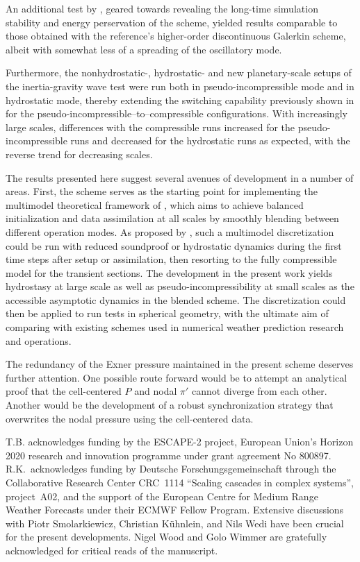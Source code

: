 \documentclass{ametsoc}
\newcommand{\sblue}[1]{\textcolor{sblue}{#1}}
\newcommand{\revision}[1]{\sblue{#1}}
\theoremstyle{definition}
\begin{document}
An additional test by \citet{BaldaufBrdar2013}, geared towards revealing the long-time simulation stability and energy perservation of the scheme, yielded results comparable to those obtained with the reference's higher-order discontinuous Galerkin scheme, albeit with somewhat less of a spreading of the oscillatory mode. 

Furthermore, the \revision{nonhydrostatic-}, hydrostatic- and new planetary-scale setups of the inertia-gravity wave test were run both in pseudo-incompressible mode and in hydrostatic mode, thereby extending the switching capability previously shown in \cite{BenacchioEtAl2014} for the pseudo-incompressible--to--compressible configurations. \revision{With increasingly large scales, differences with the compressible runs increased for the pseudo-incompressible runs and decreased for the hydrostatic runs as expected,  with the reverse trend for decreasing scales.}

The results presented here suggest several avenues of development in a number of areas. First, the scheme serves as the starting point for implementing the multimodel theoretical framework of \cite{KleinBenacchio2016}, which aims to achieve balanced initialization and data assimilation at all scales by smoothly blending between different operation modes. As proposed by \cite{BenacchioEtAl2014}, such a multimodel discretization could be run with reduced soundproof or hydrostatic dynamics during the first time steps after setup or assimilation, then resorting to the fully compressible model for the transient sections. The development in the present work yields hydrostasy at large scale as well as pseudo-incompressibility at small scales as the accessible asymptotic dynamics in the blended scheme. The discretization could then be applied to run tests in spherical geometry, with the ultimate aim of comparing with existing schemes used in numerical weather prediction research and operations.

\revision{The redundancy of the Exner pressure maintained in the present scheme deserves further attention. One possible route forward would be to attempt an analytical proof that the cell-centered $P$ and nodal $\pi'$ cannot diverge from each other. Another would be the development of a robust synchronization strategy that overwrites the nodal pressure using the cell-centered data.}

\acknowledgments

T.B. acknowledges funding by the ESCAPE-2 project, European Union's Horizon 2020 research and innovation programme under grant agreement No 800897. R.K.\ acknowledges funding by Deutsche Forschungsgemeinschaft through the Collaborative Research Center CRC~1114 ``Scaling cascades in complex systems'', project~A02, and the support of the European Centre for Medium Range Weather Forecasts under their ECMWF Fellow Program. Extensive discussions with Piotr Smolarkiewicz, Christian K\"uhnlein, and Nils Wedi have been crucial for the present developments. Nigel Wood and Golo Wimmer are gratefully acknowledged for critical reads of the manuscript.
\end{document}
